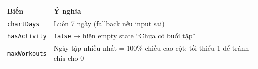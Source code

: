 \documentclass[12pt,a4paper]{article}
\newcounter{none}
\newenvironment{Shaded}{%
  \VerbatimEnvironment
  \begin{quote}\small\ttfamily
}{%
  \end{quote}%
}
\begin{document}
\begin{Shaded}
\begin{Highlighting}[]
\OperatorTok{=} \NormalTok{(}
\NormalTok{  () }\KeywordTok{=\textgreater{}} \OperatorTok{===}  \OperatorTok{:} \NormalTok{())}\OperatorTok{,}
\NormalTok{  [days]}\OperatorTok{,}
\NormalTok{)}\OperatorTok{;}
\OperatorTok{=}\OperatorTok{,}\KeywordTok{=\textgreater{}}\OperatorTok{+}\OperatorTok{,} \NormalTok{)}\OperatorTok{;}
\OperatorTok{=}\OperatorTok{\textgreater{}} \OperatorTok{;}
\OperatorTok{=} \NormalTok{(}\KeywordTok{=\textgreater{}}\NormalTok{)}\OperatorTok{,} \NormalTok{)}\OperatorTok{;}
\end{Highlighting}
\end{Shaded}

{\def\LTcaptype{none} %
\begin{longtable}[]{@{}
  >{\raggedright\arraybackslash}p{}
  >{\raggedright\arraybackslash}p{}@{}}
\toprule\noalign{}
\begin{minipage}[b]{\linewidth}\raggedright
Biến
\end{minipage} & \begin{minipage}[b]{\linewidth}\raggedright
Ý nghĩa
\end{minipage} \\
\midrule\noalign{}
\endhead
\bottomrule\noalign{}
\endlastfoot
\texttt{chartDays} & Luôn 7 ngày (fallback nếu input sai) \\
\texttt{hasActivity} & \texttt{false} → hiện empty state ``Chưa có buổi
tập'' \\
\texttt{maxWorkouts} & Ngày tập nhiều nhất = 100\% chiều cao cột; tối
thiểu 1 để tránh chia cho 0 \\
\end{longtable}
}
\end{document}
